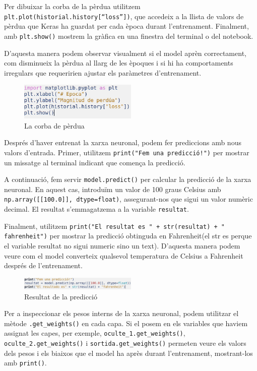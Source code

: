 Per dibuixar la corba de la pèrdua utilitzem \texttt{plt.plot(historial.history[``loss''])}, que accedeix a la llista de valors de pèrdua que Keras ha guardat per cada època durant l’entrenament. Finalment, amb \texttt{plt.show()} mostrem la gràfica en una finestra del terminal o del notebook.

D’aquesta manera podem observar visualment si el model aprèn correctament, com disminueix la pèrdua al llarg de les èpoques i si hi ha comportaments irregulars que requeririen ajustar els paràmetres d’entrenament.

\begin{figure}[H]
    \centering
    \includegraphics[width=0.5\textwidth]{./figures/7.png}
    \caption{La corba de pèrdua}
\end{figure}

Després d’haver entrenat la xarxa neuronal, podem fer prediccions amb nous valors d’entrada. Primer, utilitzem \texttt{print("Fem una predicció!")} per mostrar un missatge al terminal indicant que comença la predicció.

A continuació, fem servir \texttt{model.predict()} per calcular la predicció de la xarxa neuronal. En aquest cas, introduïm un valor de 100 graus Celsius amb \texttt{np.array([[100.0]], dtype=float)}, assegurant-nos que sigui un valor numèric decimal. El resultat s’emmagatzema a la variable \texttt{resultat}.

Finalment, utilitzem \texttt{print("El resultat es " + str(resultat) + " fahrenheit")} per mostrar la predicció obtinguda en Fahrenheit(el str es perque el variable resultat no sigui numeric sino un text). D’aquesta manera podem veure com el model converteix qualsevol temperatura de Celsius a Fahrenheit després de l’entrenament.


\begin{figure}[H]
    \centering
    \includegraphics[width=0.5\textwidth]{./figures/8.png}
    \caption{Resultat de la predicció}
\end{figure}

Per a inspeccionar els pesos interns de la xarxa neuronal, podem utilitzar el mètode \texttt{.get\_weights()} en cada capa. Si el posem en els variables que haviem assignat les capes, per exemple, \texttt{oculte\_1.get\_weights()}, \texttt{oculte\_2.get\_weights()} i \texttt{sortida.get\_weights()} permeten veure els valors dels pesos i els biaixos que el model ha après durant l’entrenament, mostrant-los amb \texttt{print()}.



